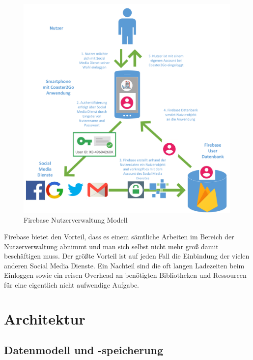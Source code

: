 \begin{figure}[htp]
	\centering
  	\includegraphics[width=0.99\textwidth]{img/modelle/firebase_modell.png}
	\caption{Firebase Nutzerverwaltung Modell}
	\label{figure:besonderheitenFirebase}
\end{figure}

Firebase bietet den Vorteil, dass es einem sämtliche Arbeiten im Bereich der Nutzerverwaltung abnimmt und man sich selbst nicht mehr groß damit beschäftigen muss. Der größte Vorteil ist auf jeden Fall die Einbindung der vielen anderen Social Media Dienste. Ein Nachteil sind die oft langen Ladezeiten beim Einloggen sowie ein reisen Overhead an benötigten Bibliotheken und Ressourcen für eine eigentlich nicht aufwendige Aufgabe.

\section{Architektur}
\label{sec:implementierung:architektur}

\subsection{Datenmodell und -speicherung}
\label{sec:implementierung:architektur:datenmodell}

